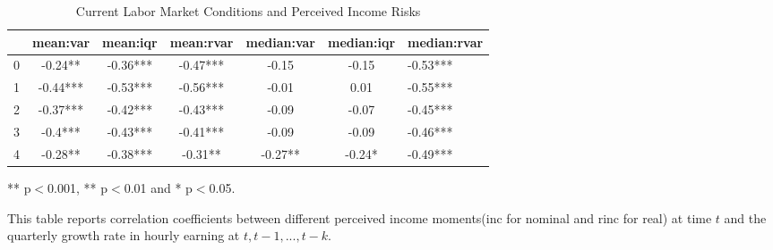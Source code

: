 
\begin{table}[ht]
\centering
\begin{adjustbox}{width={\textwidth}}
\begin{threeparttable}
\caption{Current Labor Market Conditions and Perceived Income Risks}
\label{macro_corr_he}
\begin{tabular}{ccccccl}
\toprule
{} &  mean:var &  mean:iqr & mean:rvar & median:var & median:iqr & median:rvar \\
\midrule
0 &   -0.24** &  -0.36*** &  -0.47*** &      -0.15 &      -0.15 &    -0.53*** \\
1 &  -0.44*** &  -0.53*** &  -0.56*** &      -0.01 &       0.01 &    -0.55*** \\
2 &  -0.37*** &  -0.42*** &  -0.43*** &      -0.09 &      -0.07 &    -0.45*** \\
3 &   -0.4*** &  -0.43*** &  -0.41*** &      -0.09 &      -0.09 &    -0.46*** \\
4 &   -0.28** &  -0.38*** &   -0.31** &    -0.27** &     -0.24* &    -0.49*** \\
\bottomrule
\end{tabular}
\begin{tablenotes}
\item *** p$<$0.001, ** p$<$0.01 and * p$<$0.05.
\item This table reports correlation coefficients between different perceived income moments(inc for nominal
and rinc for real) at time
$t$ and the quarterly growth rate in hourly earning at $t,t-1,...,t-k$.
\end{tablenotes}
\end{threeparttable}
\end{adjustbox}
\end{table}